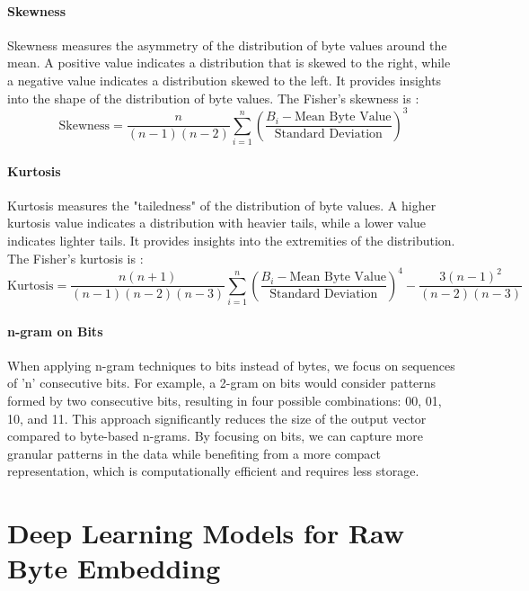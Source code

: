         \paragraph{Skewness}Skewness\cite{wheeler_problems_2011} measures the asymmetry of the distribution of byte values around the mean. A positive value indicates a distribution that is skewed to the right, while a negative value indicates a distribution skewed to the left. It provides insights into the shape of the distribution of byte values. The Fisher’s skewness\cite{cain_univariate_2017} is :
        \begin{equation}
        \text{Skewness} = \frac{n}{(n-1)(n-2)} \sum_{i=1}^{n} \left( \frac{B_i - \text{Mean Byte Value}}{\text{Standard Deviation}} \right)^3
        \label{eq:skewness}
        \end{equation}

        \paragraph{Kurtosis}Kurtosis\cite{wheeler_problems_2011} measures the "tailedness" of the distribution of byte values. A higher kurtosis value indicates a distribution with heavier tails, while a lower value indicates lighter tails. It provides insights into the extremities of the distribution. The Fisher’s kurtosis\cite{cain_univariate_2017} is :
        \begin{equation}
        \text{Kurtosis} = \frac{n(n+1)}{(n-1)(n-2)(n-3)} \sum_{i=1}^{n} \left( \frac{B_i - \text{Mean Byte Value}}{\text{Standard Deviation}} \right)^4 - \frac{3(n-1)^2}{(n-2)(n-3)}
        \label{eq:kurtosis}
        \end{equation}

        \paragraph{n-gram on Bits}When applying n-gram techniques to bits instead of bytes, we focus on sequences of 'n' consecutive bits. For example, a 2-gram on bits would consider patterns formed by two consecutive bits, resulting in four possible combinations: 00, 01, 10, and 11. This approach significantly reduces the size of the output vector compared to byte-based n-grams. By focusing on bits, we can capture more granular patterns in the data while benefiting from a more compact representation, which is computationally efficient and requires less storage.

\section{Deep Learning Models for Raw Byte Embedding}\label{seq:background:deep_learning_models_for_raw_byte_embedding}

